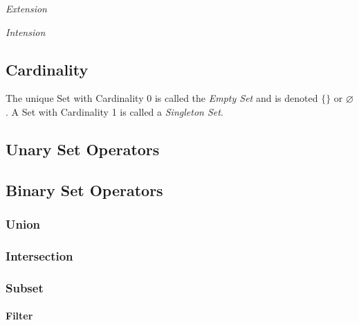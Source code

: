 \documentclass{article}
\begin{document}
\emph{Extension}

\emph{Intension}

\subsection{Cardinality}

The unique Set with Cardinality 0 is called the \emph{Empty Set} and
is denoted $\{\}$ or $\varnothing$. A Set with Cardinality 1 is called a
\emph{Singleton Set}.

\subsection{Unary Set Operators}

\subsection{Binary Set Operators}

\subsubsection{Union}

\subsubsection{Intersection}

\subsubsection{Subset}

\paragraph{Filter}
\end{document}
